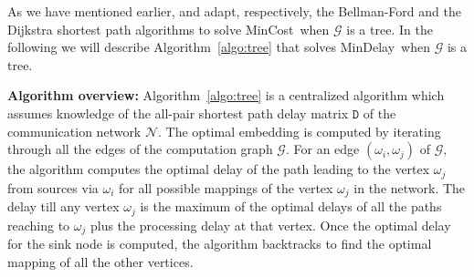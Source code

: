 \documentclass[journal]{IEEEtran}
\newcommand{\net}{\mathcal{N}}
\newcommand{\compgraph}{\mathcal{G}}
\newcommand{\mincost}{\textsf{MinCost}}
\newcommand{\mindelay}{\textsf{MinDelay}}
\begin{document}
As we have mentioned earlier, \cite{Ying08} and \cite{Shah13} adapt,
respectively, the Bellman-Ford and the Dijkstra shortest path
algorithms to solve \mincost\ when $\compgraph$ is a tree. In the
following we will describe Algorithm~\ref{algo:tree} that solves
\mindelay\ when $\compgraph$ is a tree.

\textbf{Algorithm overview:} Algorithm~\ref{algo:tree} is a
centralized algorithm which assumes knowledge of the all-pair shortest
path delay matrix $\mathtt{D}$ of the communication network $\net.$
The optimal embedding is computed by iterating through all the edges
of the computation graph $\compgraph.$ For an edge
$(\omega_i,\omega_j)$ of $\compgraph,$ the algorithm computes the
optimal delay of the path leading to the vertex $\omega_j$ from
sources via $\omega_i$ for all possible mappings of the vertex
$\omega_j$ in the network. The delay till any vertex $\omega_j$ is the
maximum of the optimal delays of all the paths reaching to $\omega_j$
plus the processing delay at that vertex. Once the optimal delay for
the sink node is computed, the algorithm backtracks to find the
optimal mapping of all the other vertices.
\end{document}
